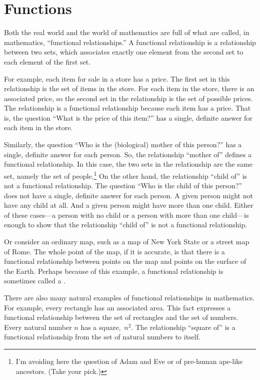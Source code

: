 \section{Functions}\label{S-sets-4}

Both the real world and the world of mathematics are full of
what are called, in mathematics, ``functional relationships.''
A functional relationship is a relationship between two sets,
which associates exactly one element from the second set to 
each element of the first set.  

For example, each item for sale in a store has a price.
The first set in this relationship is the set of items in the store.  For each
item in the store, there is an associated price, so the
second set in the relationship is the set of possible prices.
The relationship is a functional relationship because 
each item has a price.  That is, the question ``What is the price
of this item?'' has a single, definite answer for each item
in the store.

Similarly, the question ``Who is the (biological) mother of this person?'' has
a single, definite answer for each person.  So, the
relationship ``mother of'' defines a functional relationship.
In this case, the two sets in the relationship are the same set,
namely the set of people.\footnote{I'm avoiding here the question
of Adam and Eve or of pre-human ape-like ancestors.  (Take your 
pick.)}  On the other hand, the relationship ``child of''
is not a functional relationship.  The question ``Who is the
child of this person?'' does not have a single, definite answer for
each person.  A given person might not have any child at all.
And a given person might have more than one child.  Either of
these cases---a person with no child or a person with more than
one child---is enough to show that the relationship
``child of'' is not a functional relationship.

Or consider an ordinary map, such as a map of New York State or
a street map of Rome.  The whole point of the map, if it is
accurate, is that there is a functional relationship between
points on the map and points on the surface of the Earth.
Perhaps because of this example, a functional relationship
is sometimes called a .

There are also many natural examples of functional relationships
in mathematics.  For example, every rectangle has an associated
area.  This fact expresses a functional relationship between the
set of rectangles and the set of numbers.  Every natural number $n$
has a square,~$n^2$.  The relationship ``square of'' is a functional
relationship from the set of natural numbers to itself.  

